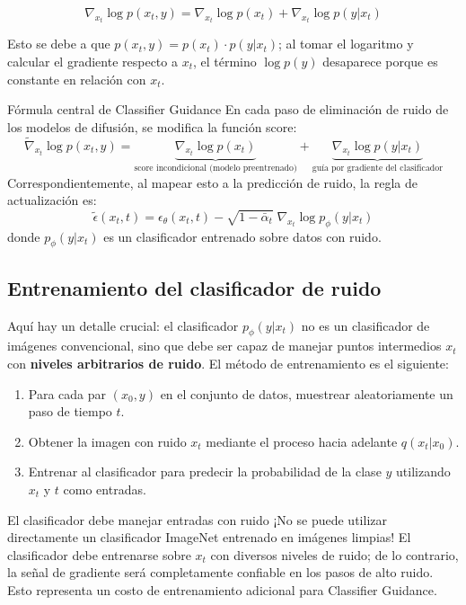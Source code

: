 \documentclass[a4paper]{article}
\begin{document}
$$
\nabla_{x_t}\log p(x_t, y) = \nabla_{x_t}\log p(x_t) + \nabla_{x_t}\log p(y|x_t)
$$

Esto se debe a que $p(x_t, y) = p(x_t)\cdot p(y|x_t)$; al tomar el logaritmo y calcular el gradiente respecto a $x_t$, el término $\log p(y)$ desaparece porque es constante en relación con $x_t$.

\begin{importantbox}{Fórmula central de Classifier Guidance}
En cada paso de eliminación de ruido de los modelos de difusión, se modifica la función score:
$$
\tilde{\nabla}_{x_t}\log p(x_t, y) = \underbrace{\nabla_{x_t}\log p(x_t)}_{\text{score incondicional (modelo preentrenado)}} + \underbrace{\nabla_{x_t}\log p(y|x_t)}_{\text{guía por gradiente del clasificador}}
$$
Correspondientemente, al mapear esto a la predicción de ruido, la regla de actualización es:
$$
\tilde{\epsilon}(x_t, t) = \epsilon_\theta(x_t, t) - \sqrt{1-\bar\alpha_t}\;\nabla_{x_t}\log p_\phi(y|x_t)
$$
donde $p_\phi(y|x_t)$ es un clasificador entrenado sobre datos con ruido.
\end{importantbox}

\subsection{Entrenamiento del clasificador de ruido}

Aquí hay un detalle crucial: el clasificador $p_\phi(y|x_t)$ no es un clasificador de imágenes convencional, sino que debe ser capaz de manejar puntos intermedios $x_t$ con \textbf{niveles arbitrarios de ruido}. El método de entrenamiento es el siguiente:

\begin{enumerate}
    \item Para cada par $(x_0, y)$ en el conjunto de datos, muestrear aleatoriamente un paso de tiempo $t$.
    \item Obtener la imagen con ruido $x_t$ mediante el proceso hacia adelante $q(x_t|x_0)$.
    \item Entrenar al clasificador para predecir la probabilidad de la clase $y$ utilizando $x_t$ y $t$ como entradas.
\end{enumerate}

\begin{warningbox}{El clasificador debe manejar entradas con ruido}
¡No se puede utilizar directamente un clasificador ImageNet entrenado en imágenes limpias! El clasificador debe entrenarse sobre $x_t$ con diversos niveles de ruido; de lo contrario, la señal de gradiente será completamente confiable en los pasos de alto ruido. Esto representa un costo de entrenamiento adicional para Classifier Guidance.
\end{warningbox}
\end{document}
